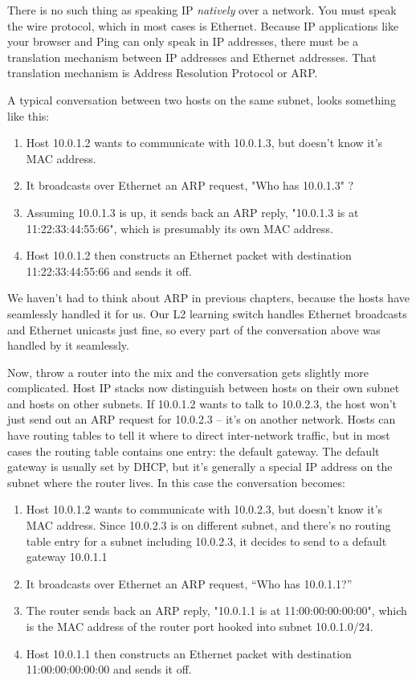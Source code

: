 There is no such thing as speaking IP \emph{natively} over a network.  You must speak the wire protocol,
which in most cases is Ethernet.  Because IP applications like your browser and Ping can only speak
in IP addresses, there must be a translation mechanism between IP addresses and Ethernet addresses.
That translation mechanism is Address Resolution Protocol or ARP.  

A typical conversation between two hosts on the same subnet, looks something like this:

\begin{enumerate}
\item Host 10.0.1.2 wants to communicate with 10.0.1.3, but doesn't know it's MAC address.
\item It broadcasts over Ethernet an ARP request, "Who has 10.0.1.3" ?
\item Assuming 10.0.1.3 is up, it sends back an ARP reply, "10.0.1.3 is at 11:22:33:44:55:66", which is
presumably its own MAC address.
\item Host 10.0.1.2 then constructs an Ethernet packet with destination 11:22:33:44:55:66 and sends it off.
\end{enumerate}

We haven't had to think about ARP in previous chapters, because the hosts have seamlessly handled it
for us.  Our L2 learning switch handles Ethernet broadcasts and Ethernet unicasts just fine, so every
part of the conversation above was handled by it seamlessly.

Now, throw a router into the mix and the conversation gets slightly more complicated.  Host IP
stacks now distinguish between hosts on their own subnet and hosts on other subnets.  If
10.0.1.2 wants to talk to 10.0.2.3, the host won't just send out an ARP request for 10.0.2.3 -- it's
on another network.  Hosts can have routing tables to tell it where to direct inter-network
traffic, but in most cases the routing table contains one entry: the default gateway.  The default
gateway is usually set by DHCP, but it's generally a special IP address on the subnet where the
router lives. In this case the conversation becomes:

\begin{enumerate}
\item Host 10.0.1.2 wants to communicate with 10.0.2.3, but doesn't know it's MAC address.  Since
10.0.2.3 is on different subnet, and there's no routing table entry for a subnet including 10.0.2.3,
it decides to send to a default gateway 10.0.1.1
\item It broadcasts over Ethernet an ARP request, ``Who has 10.0.1.1?''
\item The router sends back an ARP reply, "10.0.1.1 is at 11:00:00:00:00:00", which is
the MAC address of the router port hooked into subnet 10.0.1.0/24.
\item Host 10.0.1.1 then constructs an Ethernet packet with destination 11:00:00:00:00:00 and sends it off.
\end{enumerate}

